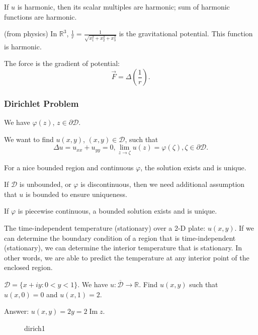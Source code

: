 If $u$ is harmonic, then its scalar multiples are harmonic; sum of harmonic functions are harmonic.



\begin{example}
	(from physics) In $\mathbb{R}^3$, $\frac{1}{r} = \frac{1}{\sqrt{x_1^2 + x_2^2 + x_3^2} }$ is the gravitational potential. This function is harmonic.
	
	The force is the gradient of potential: \[
		\vec{F} =\Delta(\frac{1}{r})
	.\] 
\end{example}
\subsubsection{Dirichlet Problem}
\begin{problem}
	We have $\varphi(z)$, $z \in \partial \mathcal{D}$. 

We want to find $u(x,y)$, $(x,y) \in \mathcal{D}$, such that 
\[
	\Delta u = u_{x x}+u_{y y} =0, \lim_{z \to \zeta} u(z) = \varphi(\zeta), \zeta \in \partial \mathcal{D}
.\] 
\end{problem}

\begin{fact}
	
For a nice bounded region and continuous $\varphi$, the solution exists and is unique.

If $\mathcal{D}$ is unbounded, or $\varphi$ is discontinuous, then we need additional assumption that $u$ is bounded to ensure uniqueness.

If $\varphi$ is piecewise continuous, a bounded solution exists and is unique.
\end{fact}



\begin{example}
	The time-independent temperature (stationary) over a 2-D plate: $u(x,y)$. If we can determine the boundary condition of a region that is time-independent (stationary), we can determine the interior temperature that is stationary. In other words, we are able to predict the temperature at any interior point of the enclosed region.
\end{example}


\begin{example}
	$\mathcal{D} = \{x+iy:0<y<1\} $. We have $u: \overline{\mathcal{D}} \to \mathbb{R}$. Find $u(x,y)$ such that $u(x,0)=0$ and $u(x,1) = 2$.

	Answer: $u(x,y) = 2y = 2 \operatorname{Im} z$.

\begin{figure}[H]
    \centering
    \caption{dirich1}
    \label{fig:dirich1}
\end{figure}
\end{example}
